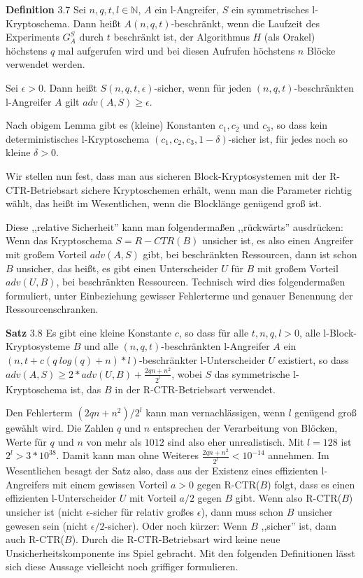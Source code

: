 \documentclass[a4paper]{article}
\begin{document}
\begin{multicols}{3}
    \textbf{Definition} 3.7 Sei $n,q,t,l\in\mathbb{N}$, $A$ ein l-Angreifer, $S$ ein symmetrisches l-Kryptoschema. Dann heißt $A(n,q,t)$-beschränkt, wenn die Laufzeit des Experiments $G^S_A$ durch $t$ beschränkt ist, der Algorithmus $H$ (als Orakel) höchstens $q$ mal aufgerufen wird und bei diesen Aufrufen höchstens $n$ Blöcke verwendet werden.

    Sei $\epsilon> 0$. Dann heißt $S(n,q,t,\epsilon)$-sicher, wenn für jeden $(n,q,t)$-beschränkten l-Angreifer $A$ gilt $adv(A,S)\geq\epsilon$.

    Nach obigem Lemma gibt es (kleine) Konstanten $c_1,c_2$ und $c_3$, so dass kein deterministisches l-Kryptoschema $(c_1,c_2,c_3,1-\delta)$-sicher ist, für jedes noch so kleine $\delta > 0$.

    Wir stellen nun fest, dass man aus sicheren Block-Kryptosystemen mit der R-CTR-Betriebsart sichere Kryptoschemen erhält, wenn man die Parameter richtig wählt, das heißt im Wesentlichen, wenn die Blocklänge genügend groß ist.

    Diese ,,relative Sicherheit'' kann man folgendermaßen ,,rückwärts'' ausdrücken: Wenn das Kryptoschema $S=R-CTR(B)$ unsicher ist, es also einen Angreifer mit großem Vorteil $adv(A,S)$ gibt, bei beschränkten Ressourcen, dann ist schon $B$ unsicher, das heißt, es gibt einen Unterscheider $U$ für $B$ mit großem Vorteil $adv(U,B)$, bei beschränkten Ressourcen. Technisch wird dies folgendermaßen formuliert, unter Einbeziehung gewisser Fehlerterme und genauer Benennung der Ressourcenschranken.

    \textbf{Satz} 3.8 Es gibt eine kleine Konstante $c$, so dass für alle $t,n,q,l > 0$, alle l-Block-Kryptosysteme $B$ und alle $(n,q,t)$-beschränkten l-Angreifer $A$ ein $(n,t+c(q\ log(q) +n)*l)$-beschränkter l-Unterscheider $U$ existiert, so dass $adv(A,S)\geq 2 *adv(U,B) + \frac{2 qn+n^2}{2^l}$, wobei $S$ das symmetrische l-Kryptoschema ist, das $B$ in der R-CTR-Betriebsart verwendet.

    Den Fehlerterm $(2qn+n^2)/2^l$ kann man vernachlässigen, wenn $l$ genügend groß gewählt wird. Die Zahlen $q$ und $n$ entsprechen der Verarbeitung von Blöcken, Werte für $q$ und $n$ von mehr als $1012$ sind also eher unrealistisch. Mit $l=128$ ist $2^l> 3 * 10^{38}$. Damit kann man ohne Weiteres $\frac{2qn+n^2}{2^l} <10^{-14}$ annehmen. Im Wesentlichen besagt der Satz also, dass aus der Existenz eines effizienten l-Angreifers mit einem gewissen Vorteil $a>0$ gegen R-CTR($B$) folgt, dass es einen effizienten l-Unterscheider $U$ mit Vorteil $a/2$ gegen $B$ gibt. Wenn also R-CTR($B$) unsicher ist (nicht $\epsilon$-sicher für relativ großes $\epsilon$), dann muss schon $B$ unsicher gewesen sein (nicht $\epsilon/2$-sicher). Oder noch kürzer: Wenn $B$ ,,sicher'' ist, dann auch R-CTR($B$). Durch die R-CTR-Betriebsart wird keine neue Unsicherheitskomponente ins Spiel gebracht.
    Mit den folgenden Definitionen lässt sich diese Aussage vielleicht noch griffiger formulieren.


\end{multicols}
\end{document}
